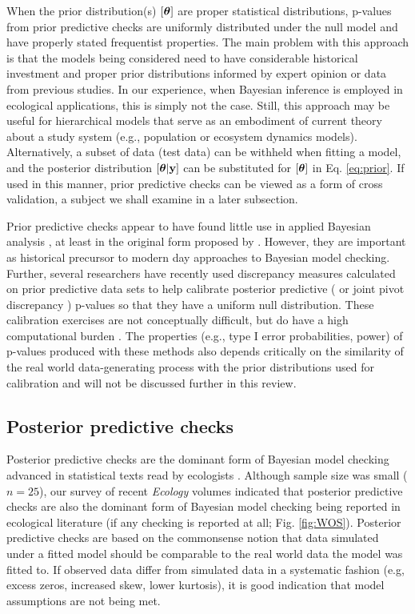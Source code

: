 \documentclass[12pt,english]{article}
\begin{document}
\begin{spacing}{1.9}
When the prior distribution(s) $[\boldsymbol{\theta}]$ are proper statistical distributions, p-values from prior predictive checks are uniformly distributed under the null model and have properly stated frequentist properties.  The main problem with this approach is that the models being considered need to have considerable historical investment and proper prior distributions informed by expert opinion or data from previous studies.  In our experience, when Bayesian inference is employed in ecological applications, this is simply not the case.  Still, this approach may be useful for hierarchical models that serve as an embodiment of current theory about a study system (e.g., population or ecosystem dynamics models).  Alternatively, a subset of data (test data) can be withheld when fitting a model, and the posterior distribution $[\boldsymbol{\theta}|{\bf y}]$ can be substituted for $[\boldsymbol{\theta}]$ in Eq. \ref{eq:prior}.  If used in this manner, prior predictive checks can be viewed as a form of cross validation, a subject we shall examine in a later subsection.

Prior predictive checks appear to have found little use in applied Bayesian analysis \citep[but see][]{DeyEtAl1998}, at least in the original form proposed by \citet{Box1980}. However, they are important as historical precursor to modern day approaches to Bayesian model checking. Further, several researchers have recently used discrepancy measures calculated on prior predictive data sets to help calibrate posterior predictive (\citep[e.g.][]{HjortEtAl2006} or joint pivot discrepancy \citep{Johnson2007}) p-values so that they have a uniform null distribution.  These calibration exercises are not conceptually difficult, but do have a high computational burden \citep{YuanJohnson2012}. The properties (e.g., type I error probabilities, power) of p-values produced with these methods also depends critically on the similarity of the real world data-generating process with the prior distributions used for calibration \citep{Zhang2014} and will not be discussed further in this review.

\subsection{Posterior predictive checks}

Posterior predictive checks are the dominant form of Bayesian model checking advanced in statistical texts read by ecologists \citep[e.g.,][]{KingEtAl2009,LinkBarker2010,KerySchaub2012,GelmanEtAl2014}. Although sample size was small ($n=25$), our survey of recent \textit{Ecology} volumes indicated that posterior predictive checks are also the dominant form of Bayesian model checking being reported in ecological literature (if any checking is reported at all; Fig. \ref{fig:WOS}).  Posterior predictive checks are based on the commonsense notion that data simulated under a fitted model should be comparable to the real world data the model was fitted to. If observed data differ from simulated data in a systematic fashion (e.g, excess zeros, increased skew, lower kurtosis), it is good indication that model assumptions are not being met.


\end{spacing}
\end{document}
